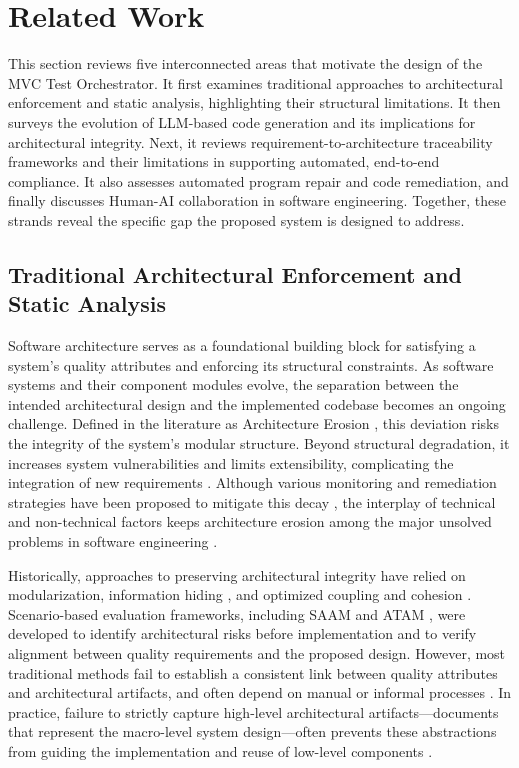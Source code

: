 \section{Related Work}
\label{sec:related_work}

This section reviews five interconnected areas that motivate the
design of the MVC Test Orchestrator. It first examines traditional
approaches to architectural enforcement and static analysis,
highlighting their structural limitations. It then surveys the
evolution of LLM-based code generation and its implications for
architectural integrity. Next, it reviews requirement-to-architecture
traceability frameworks and their limitations in supporting automated,
end-to-end compliance. It also assesses automated program repair and
code remediation, and finally discusses Human-AI collaboration in
software engineering. Together, these strands reveal the specific gap
the proposed system is designed to address.

\subsection{Traditional Architectural Enforcement and Static Analysis}
\label{sec:related_static}

Software architecture serves as a foundational building block for
satisfying a system's quality attributes and enforcing its structural
constraints. As software systems and their component modules evolve,
the separation between the intended architectural design and the
implemented codebase becomes an ongoing challenge. Defined in the
literature as Architecture Erosion \citep{Li2022}, this
deviation risks the integrity of the system's modular structure.
Beyond structural degradation, it increases system vulnerabilities
and limits extensibility, complicating the integration of new
requirements \citep{Li2022}. Although various monitoring and
remediation strategies have been proposed to mitigate this decay
\citep{deSilva2012}, the interplay of technical and non-technical
factors keeps architecture erosion among the major unsolved problems in software
engineering \citep{Li2022}.

Historically, approaches to preserving architectural integrity have
relied on modularization, information hiding \citep{Parnas1972}, and
optimized coupling and cohesion \citep{Yourdon1979}.
Scenario-based evaluation frameworks, including SAAM \citep{Kazman1994}
and ATAM \citep{Kazman2000}, were developed to identify architectural
risks before implementation and to verify alignment between quality
requirements and the proposed design. However, most traditional methods
fail to establish a consistent link between quality attributes and
architectural artifacts, and often depend on manual or informal
processes \citep{Dobrica2002}. In practice, failure to strictly capture
high-level architectural artifacts---documents that represent the
macro-level system design---often prevents these abstractions from
guiding the implementation and reuse of low-level components
\citep{Lung1997}.

